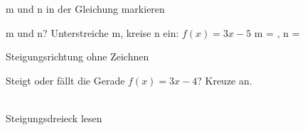 \setcounter{aufgabe}{11}

\begin{aufgabe}{m und n in der Gleichung markieren}
\begin{teile}
\teil m und n? Unterstreiche m, kreise n ein: $f(x) = 3x - 5$ m = \leerfeld , n = \leerfeld
\end{teile}
\end{aufgabe}

\begin{aufgabe}{Steigungsrichtung ohne Zeichnen}
\begin{teile}
\teil Steigt oder fällt die Gerade $f(x) = 3x - 4$? Kreuze an. \\  \\ 
\end{teile}
\end{aufgabe}

\begin{aufgabe}{Steigungsdreieck lesen}
\end{aufgabe}

